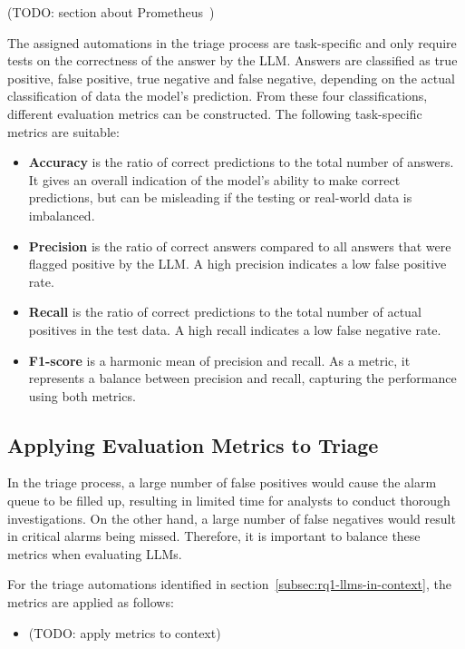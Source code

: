 (TODO: section about Prometheus\ \citep{kim2023prometheus})

The assigned automations in the triage process are task-specific and only require tests on the correctness of the answer
by the LLM\@.
Answers are classified as true positive, false positive, true negative and false negative, depending on the actual
classification of data the model's prediction.
From these four classifications, different evaluation metrics can be constructed.
The following task-specific metrics are suitable:
\begin{itemize}
    \item \textbf{Accuracy} is the ratio of correct predictions to the total number of answers.
    It gives an overall indication of the model's ability to make correct predictions, but can be misleading if the
    testing or real-world data is imbalanced.
    \item \textbf{Precision} is the ratio of correct answers compared to all answers that were flagged positive by the
    LLM\@.
    A high precision indicates a low false positive rate.
    \item \textbf{Recall} is the ratio of correct predictions to the total number of actual positives in the test data.
    A high recall indicates a low false negative rate.
    \item \textbf{F1-score} is a harmonic mean of precision and recall.
    As a metric, it represents a balance between precision and recall, capturing the performance using both metrics.
\end{itemize}

\subsection{Applying Evaluation Metrics to Triage}
\label{subsec:rq2-evaluating-triage}

In the triage process, a large number of false positives would cause the alarm queue to be filled up, resulting in
limited time for analysts to conduct thorough investigations.
On the other hand, a large number of false negatives would result in critical alarms being missed.
Therefore, it is important to balance these metrics when evaluating LLMs.

For the triage automations identified in section\ \ref{subsec:rq1-llms-in-context}, the metrics are applied as
follows:
\begin{itemize}
    \item (TODO: apply metrics to context) %
\end{itemize}
